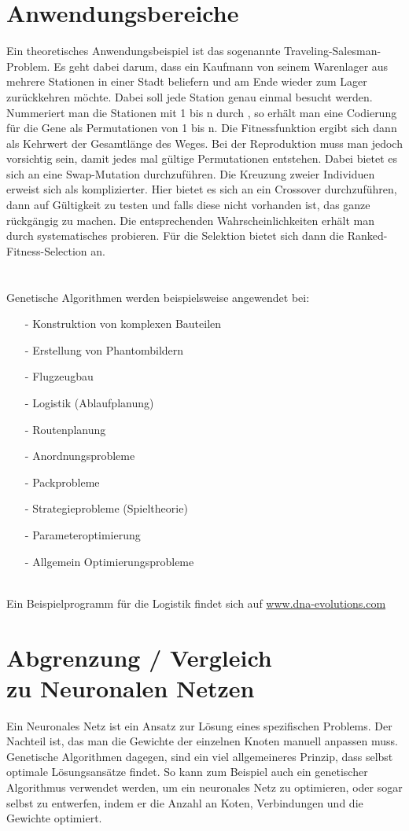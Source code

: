 \section{Anwendungsbereiche}
Ein theoretisches Anwendungsbeispiel ist das sogenannte Traveling-Salesman-Problem. Es geht dabei darum, dass ein Kaufmann von seinem Warenlager aus mehrere Stationen in einer Stadt beliefern und am Ende wieder zum Lager zurückkehren möchte. Dabei soll jede Station genau einmal besucht werden. Nummeriert man die Stationen mit 1 bis n durch , so erhält man eine Codierung für die Gene als Permutationen von 1 bis n. Die Fitnessfunktion ergibt sich dann als Kehrwert der Gesamtlänge des Weges. Bei der Reproduktion muss man jedoch vorsichtig sein, damit jedes mal gültige Permutationen entstehen. Dabei bietet es sich an eine Swap-Mutation durchzuführen. Die Kreuzung zweier Individuen erweist sich als komplizierter. Hier bietet es sich an ein Crossover durchzuführen, dann auf Gültigkeit zu testen und falls diese nicht vorhanden ist, das ganze rückgängig zu machen. Die entsprechenden Wahrscheinlichkeiten erhält man durch systematisches probieren. Für die Selektion bietet sich dann die Ranked-Fitness-Selection an.\\
\\
\\
Genetische Algorithmen werden beispielsweise angewendet bei:
\begin{itemize}
	\item[-] Konstruktion von komplexen Bauteilen
	\item[-] Erstellung von Phantombildern
	\item[-] Flugzeugbau
	\item[-] Logistik (Ablaufplanung)
	\item[-] Routenplanung
	\item[-] Anordnungsprobleme
	\item[-] Packprobleme
	\item[-] Strategieprobleme (Spieltheorie)
	\item[-] Parameteroptimierung
	\item[-] Allgemein Optimierungsprobleme
\end{itemize}
\ \\
Ein Beispielprogramm für die Logistik findet sich auf \href{http://www.dna-evolutions.com}{www.dna-evolutions.com}

\section{Abgrenzung / Vergleich \\ zu Neuronalen Netzen}
Ein Neuronales Netz ist ein Ansatz zur Lösung eines spezifischen Problems. Der Nachteil ist, das man die Gewichte der einzelnen Knoten manuell anpassen muss. Genetische Algorithmen dagegen, sind ein viel allgemeineres Prinzip, dass selbst optimale Lösungsansätze findet. So kann zum Beispiel auch ein genetischer Algorithmus verwendet werden, um ein neuronales Netz zu optimieren, oder sogar selbst zu entwerfen, indem er die Anzahl an Koten, Verbindungen und die Gewichte optimiert.\\

